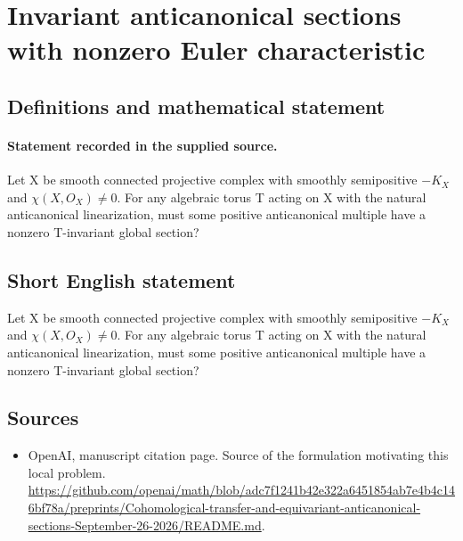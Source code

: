 \documentclass[11pt]{article}
\begin{document}
\section*{Invariant anticanonical sections with nonzero Euler characteristic}\label{30007065}
\subsection{Definitions and mathematical statement}
\paragraph{Statement recorded in the supplied source.}
Let X be smooth connected projective complex with smoothly semipositive $-K_X$ and $\chi (X,O_X)\neq 0$. For any algebraic torus T acting on X with the natural anticanonical linearization, must some positive anticanonical multiple have a nonzero T-invariant global section?
\subsection{Short English statement}
Let X be smooth connected projective complex with smoothly semipositive $-K_X$ and $\chi (X,O_X)\neq 0$. For any algebraic torus T acting on X with the natural anticanonical linearization, must some positive anticanonical multiple have a nonzero T-invariant global section?
\subsection{Sources}
\begin{itemize}
\item[S1] OpenAI, manuscript citation page. Source of the formulation motivating this local problem.
\url{https://github.com/openai/math/blob/adc7f1241b42e322a6451854ab7e4b4c146bf78a/preprints/Cohomological-transfer-and-equivariant-anticanonical-sections-September-26-2026/README.md}.
\end{itemize}
\end{document}
